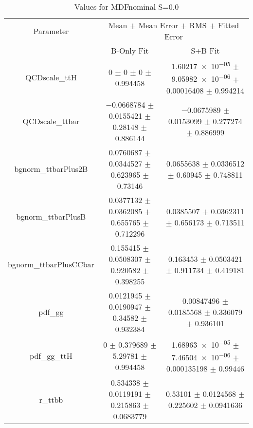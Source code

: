 \begin{table}
\centering
\caption{Values for MDFnominal S=0.0}
\begin{tabular}{ccc}
\toprule
Parameter & \multicolumn{2}{c}{Mean $\pm$ Mean Error $\pm$ RMS $\pm$ Fitted Error}\\
 & B-Only Fit & S+B Fit\\
\midrule
QCDscale\_ttH & \num{0} $\pm$ \num{0} $\pm$ \num{0} $\pm$ \num{0.994458} & \num{1.60217e-05} $\pm$ \num{9.05982e-06} $\pm$ \num{0.00016408} $\pm$ \num{0.994214}\\
QCDscale\_ttbar & \num{-0.0668784} $\pm$ \num{0.0155421} $\pm$ \num{0.28148} $\pm$ \num{0.886144} & \num{-0.0675989} $\pm$ \num{0.0153099} $\pm$ \num{0.277274} $\pm$ \num{0.886999}\\
bgnorm\_ttbarPlus2B & \num{0.0760687} $\pm$ \num{0.0344527} $\pm$ \num{0.623965} $\pm$ \num{0.73146} & \num{0.0655638} $\pm$ \num{0.0336512} $\pm$ \num{0.60945} $\pm$ \num{0.748811}\\
bgnorm\_ttbarPlusB & \num{0.0377132} $\pm$ \num{0.0362085} $\pm$ \num{0.655765} $\pm$ \num{0.712296} & \num{0.0385507} $\pm$ \num{0.0362311} $\pm$ \num{0.656173} $\pm$ \num{0.713511}\\
bgnorm\_ttbarPlusCCbar & \num{0.155415} $\pm$ \num{0.0508307} $\pm$ \num{0.920582} $\pm$ \num{0.398255} & \num{0.163453} $\pm$ \num{0.0503421} $\pm$ \num{0.911734} $\pm$ \num{0.419181}\\
pdf\_gg & \num{0.0121945} $\pm$ \num{0.0190947} $\pm$ \num{0.34582} $\pm$ \num{0.932384} & \num{0.00847496} $\pm$ \num{0.0185568} $\pm$ \num{0.336079} $\pm$ \num{0.936101}\\
pdf\_gg\_ttH & \num{0} $\pm$ \num{0.379689} $\pm$ \num{5.29781} $\pm$ \num{0.994458} & \num{1.68963e-05} $\pm$ \num{7.46504e-06} $\pm$ \num{0.000135198} $\pm$ \num{0.99446}\\
r\_ttbb & \num{0.534338} $\pm$ \num{0.0119191} $\pm$ \num{0.215863} $\pm$ \num{0.0683779} & \num{0.53101} $\pm$ \num{0.0124568} $\pm$ \num{0.225602} $\pm$ \num{0.0941636}\\
\bottomrule
\end{tabular}
\end{table}